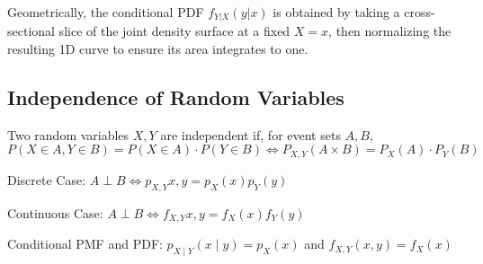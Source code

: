 \documentclass[../Probability.tex]{subfiles}
\begin{document}
\noindent Geometrically, the conditional PDF $f_{Y|X}(y|x)$ is obtained by 
taking a cross-sectional slice of the joint density surface 
at a fixed $X=x$, then normalizing the resulting 1D curve 
to ensure its area integrates to one.

\subsection{Independence of Random Variables}
Two random variables $X,Y$ are independent if, for event sets $A,B$,
\[P(X\in A,Y\in B) = P(X\in A)\cdot P(Y\in B) \iff P_{X,Y}(A \times B) = P_X(A)\cdot P_Y(B)\]

\noindent Discrete Case: $A\perp B \iff p_{X,Y}{x,y} = p_X(x)p_Y(y)$

\noindent Continuous Case: $A\perp B \iff f_{X,Y}{x,y} = f_X(x)f_Y(y)$

\medskip

\noindent Conditional PMF and PDF: $p_{X\mid Y}(x\mid y) = p_X(x)$ and $f_{X,Y}(x,y) = f_X(x)$
\end{document}
